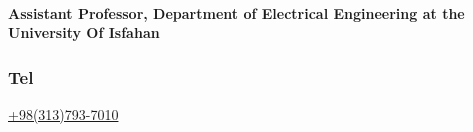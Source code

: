 \documentclass[a4paper]{article}
\begin{document}
\begin{multicols}{3}[]
        \paragraph{Assistant Professor, Department of Electrical Engineering at the University Of Isfahan}
        \subsubsection{\large Tel} {\large\href{tel:+983137937010}{+98(313)793-7010}}
        
        \Large\href{mailto:m.kazemi@eng.ui.ac.ir}{}
        \Large\href{https://engold.ui.ac.ir/~m.kazemi}{}
        \Large\href{https://ir.linkedin.com/in/mohammad-kazemi-602a2722}{}
        \end{multicols}
\end{document}
